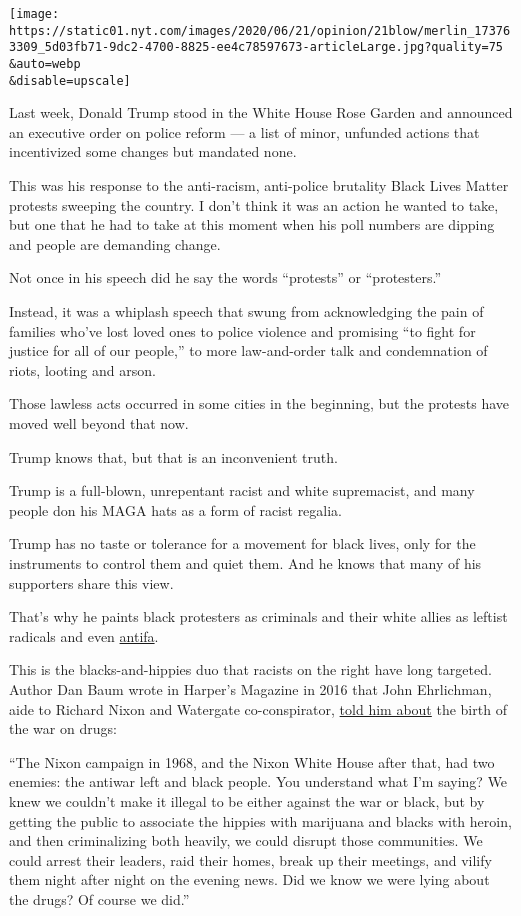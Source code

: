\texttt{[image: https://static01.nyt.com/images/2020/06/21/opinion/21blow/merlin\_173763309\_5d03fb71-9dc2-4700-8825-ee4c78597673-articleLarge.jpg?quality=75\\\&auto=webp\\\&disable=upscale]}

Last week, Donald Trump stood in the White House Rose Garden and
announced an executive order on police reform --- a list of minor,
unfunded actions that incentivized some changes but mandated none.

This was his response to the anti-racism, anti-police brutality Black
Lives Matter protests sweeping the country. I don't think it was an
action he wanted to take, but one that he had to take at this moment
when his poll numbers are dipping and people are demanding change.

Not once in his speech did he say the words ``protests'' or
``protesters.''

Instead, it was a whiplash speech that swung from acknowledging the pain
of families who've lost loved ones to police violence and promising ``to
fight for justice for all of our people,'' to more law-and-order talk
and condemnation of riots, looting and arson.

Those lawless acts occurred in some cities in the beginning, but the
protests have moved well beyond that now.

Trump knows that, but that is an inconvenient truth.

Trump is a full-blown, unrepentant racist and white supremacist, and
many people don his MAGA hats as a form of racist regalia.

Trump has no taste or tolerance for a movement for black lives, only for
the instruments to control them and quiet them. And he knows that many
of his supporters share this view.

That's why he paints black protesters as criminals and their white
allies as leftist radicals and even
\href{https://www.nytimes.com/article/what-antifa-trump.html}{antifa}.

This is the blacks-and-hippies duo that racists on the right have long
targeted. Author Dan Baum wrote in Harper's Magazine in 2016 that John
Ehrlichman, aide to Richard Nixon and Watergate co-conspirator,
\href{https://harpers.org/archive/2016/04/legalize-it-all/}{told him
about} the birth of the war on drugs:

``The Nixon campaign in 1968, and the Nixon White House after that, had
two enemies: the antiwar left and black people. You understand what I'm
saying? We knew we couldn't make it illegal to be either against the war
or black, but by getting the public to associate the hippies with
marijuana and blacks with heroin, and then criminalizing both heavily,
we could disrupt those communities. We could arrest their leaders, raid
their homes, break up their meetings, and vilify them night after night
on the evening news. Did we know we were lying about the drugs? Of
course we did.''

